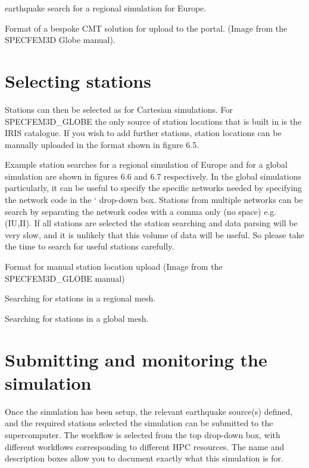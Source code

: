 \documentclass[english]{book}
\begin{document}
 earthquake search for a regional simulation for
Europe.


 Format of a bespoke CMT solution for upload to the
portal. (Image from the SPECFEM3D Globe manual).


\section{Selecting stations}
\label{\detokenize{Section6:selecting-stations}}
Stations can then be selected as for Cartesian simulations. For
SPECFEM3D\_GLOBE the only source of station locations that is built in
is the IRIS catalogue. If you wish to add further stations, station
locations can be manually uploaded in the format shown in figure 6.5.

Example station searches for a regional simulation of Europe and for a
global simulation are shown in figures 6.6 and 6.7 respectively. In the
global simulations particularly, it can be useful to specify the
specific networks needed by specifying the network code in the
‘ drop-down box. Stations from multiple networks can be
search by separating the network codes with a comma only (no space) e.g.
(IU,II). If all stations are selected the station searching and data
parsing will be very slow, and it is unlikely that this volume of data
will be useful. So please take the time to search for useful stations
carefully.


 Format for manual station location upload (Image from
the SPECFEM3D\_GLOBE manual)


 Searching for stations in a regional mesh.


 Searching for stations in a global mesh.


\section{Submitting and monitoring the simulation}
\label{\detokenize{Section6:submitting-and-monitoring-the-simulation}}
Once the simulation has been setup, the relevant earthquake source(s)
defined, and the required stations selected the simulation can be
submitted to the supercomputer. The workflow is selected from the top
drop-down box, with different workflows corresponding to different HPC
resources. The name and description boxes allow you to document exactly
what this simulation is for.
\end{document}
